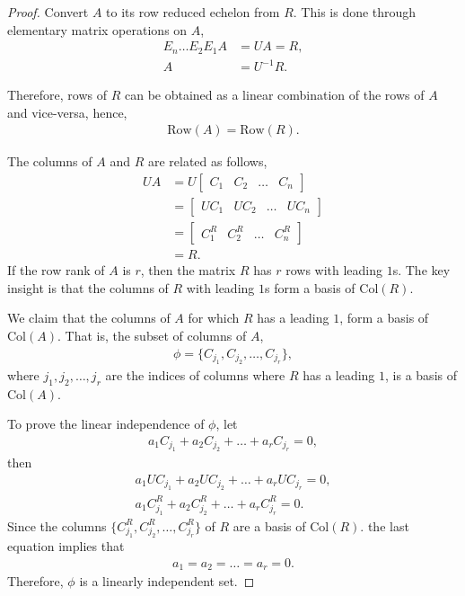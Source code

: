 \documentclass{amsart}
\theoremstyle{plain}
\numberwithin{equation}{section}
\begin{document}
\begin{proof}
Convert $A$ to its row reduced 
echelon from $R$. This is done through elementary matrix operations on $A$, 
\begin{align*}
E_n \ldots E_2E_1A &= UA = R,\\
A &= U^{-1}R.
\end{align*}

Therefore, rows of $R$ can be obtained as a linear combination of 
the rows of $A$ and vice-versa, hence,
\begin{align*}
\mathrm{Row}(A) = \mathrm{Row}(R).
\end{align*}

The columns of $A$ and $R$ are related as follows,
\begin{align*}
UA &= U\begin{bmatrix}
C_1 & C_2 & \ldots & C_n
\end{bmatrix}\\
&= \begin{bmatrix}
UC_1 & UC_2 & \ldots & UC_n
\end{bmatrix}\\
&= \begin{bmatrix}
C^{R}_1 & C^{R}_2 & \ldots & C^{R}_n
\end{bmatrix}\\
&= R.
\end{align*}
If the row rank of $A$ is $r$, then the matrix $R$ has $r$ rows 
with leading $1$s. The key insight is that the columns of $R$ with leading $1$s form a basis 
of $\mathrm{Col}(R)$. 

We claim that the columns of $A$ 
for which $R$ has a leading $1$, form a
basis of $\mathrm{Col}(A)$. That is, the subset of columns 
of $A$,
\begin{align*}
\phi = \{C_{j_1}, C_{j_2}, \ldots, C_{j_r}\},
\end{align*}
where $j_1, j_2, \ldots, j_r$ are the indices of 
columns where $R$ has a leading $1$, is a basis of 
$\mathrm{Col}(A)$. 

To prove the linear independence of $\phi$, let
\begin{align*}
a_1 C_{j_1} + a_2 C_{j_2} + \ldots + a_r C_{j_r} = 0,
\end{align*}
then 
\begin{align*}
a_1 UC_{j_1} + a_2 UC_{j_2} + \ldots + a_r UC_{j_r} = 0,\\
a_1 C^{R}_{j_1} + a_2 C^{R}_{j_2} + \ldots + a_r C^{R}_{j_r} = 0.
\end{align*}
Since the columns $\{C^{R}_{j_1}, C^{R}_{j_2}, \ldots, C^{R}_{j_r}\}$ 
of $R$ are a basis of $\mathrm{Col}(R)$.
the last equation implies that 
\begin{align*}
a_1 = a_2 = \ldots = a_r = 0.
\end{align*}
Therefore, $\phi$ is a linearly independent set. 


\end{proof}
\end{document}
